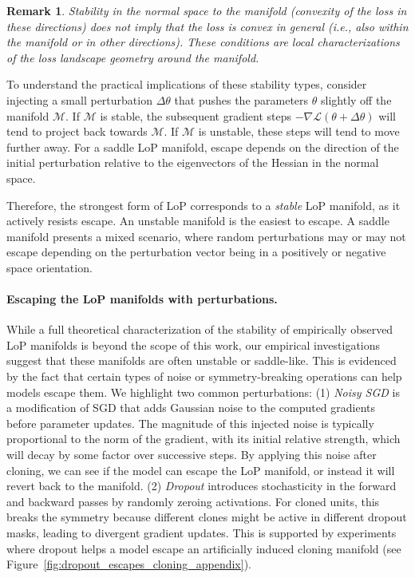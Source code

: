 \documentclass{article}
\newcommand{\Loss}{\mathcal{L}}
\newcommand{\GIU}[1]{\todo[color=purple!30,size=\tiny]{GIU: #1}}
\newtheorem{remark}{Remark}[section]
\numberwithin{figure}{section}
\begin{document}
\begin{remark}
Stability in the normal space to the manifold (convexity of the loss in these directions) does not imply that the loss is convex in general (i.e., also within the manifold or in other directions). These conditions are local characterizations of the loss landscape geometry around the manifold.
\end{remark}

To understand the practical implications of these stability types, consider injecting a small perturbation $\Delta\theta$ that pushes the parameters $\theta$ slightly off the manifold $\mathcal{M}$. If $\mathcal{M}$ is stable, the subsequent gradient steps $-\nabla \Loss(\theta+\Delta\theta)$ will tend to project back towards $\mathcal{M}$. If $\mathcal{M}$ is unstable, these steps will tend to move further away. For a saddle LoP manifold, escape depends on the direction of the initial perturbation relative to the eigenvectors of the Hessian in the normal space.

Therefore, the strongest form of LoP corresponds to a \emph{stable} LoP manifold, as it actively resists escape. An unstable manifold is the easiest to escape. A saddle manifold presents a mixed scenario, where random perturbations may or may not escape depending on the perturbation vector being in a positively or negative space orientation. 

\paragraph{Escaping the LoP manifolds with perturbations.}
While a full theoretical characterization of the stability of empirically observed LoP manifolds is beyond the scope of this work, our empirical investigations suggest that these manifolds are often unstable or saddle-like. This is evidenced by the fact that certain types of noise or symmetry-breaking operations can help models escape them. We highlight two common perturbations:
(1) \emph{Noisy SGD} is a modification of SGD that adds Gaussian noise to the computed gradients before parameter updates. The magnitude of this injected noise is typically proportional to the norm of the gradient, with its initial relative strength, which will decay by some factor over successive steps. By applying this noise after cloning, we can see if the model can escape the LoP manifold, or instead it will revert back to the manifold. 
(2) \emph{Dropout} introduces stochasticity in the forward and backward passes by randomly zeroing activations. For cloned units, this breaks the symmetry because different clones might be active in different dropout masks, leading to divergent gradient updates. This is supported by experiments where dropout helps a model escape an artificially induced cloning manifold (see Figure~\ref{fig:dropout_escapes_cloning_appendix}).
    
\end{document}
